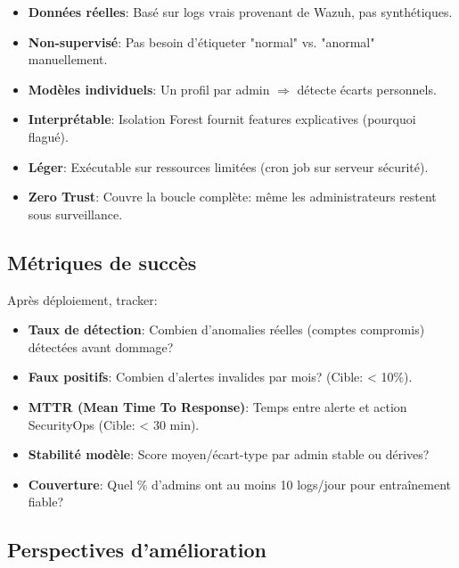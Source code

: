 \begin{itemize}
	\item \textbf{Données réelles}: Basé sur logs vrais provenant de Wazuh, pas synthétiques.
	
	\item \textbf{Non-supervisé}: Pas besoin d'étiqueter "normal" vs. "anormal" manuellement.
	
	\item \textbf{Modèles individuels}: Un profil par admin $\Rightarrow$ détecte écarts personnels.
	
	\item \textbf{Interprétable}: Isolation Forest fournit features explicatives (pourquoi flagué).
	
	\item \textbf{Léger}: Exécutable sur ressources limitées (cron job sur serveur sécurité).
	
	\item \textbf{Zero Trust}: Couvre la boucle complète: même les administrateurs restent sous surveillance.
\end{itemize}

\subsection{Métriques de succès}

Après déploiement, tracker:

\begin{itemize}
	\item \textbf{Taux de détection}: Combien d'anomalies réelles (comptes compromis) détectées avant dommage?
	
	\item \textbf{Faux positifs}: Combien d'alertes invalides par mois? (Cible: < 10\%).
	
	\item \textbf{MTTR (Mean Time To Response)}: Temps entre alerte et action SecurityOps (Cible: < 30 min).
	
	\item \textbf{Stabilité modèle}: Score moyen/écart-type par admin stable ou dérives?
	
	\item \textbf{Couverture}: Quel \% d'admins ont au moins 10 logs/jour pour entraînement fiable?
\end{itemize}

\subsection{Perspectives d'amélioration}

